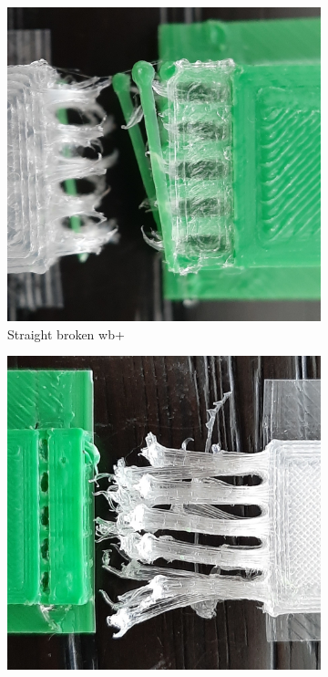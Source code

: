 \begin{figure}
\begin{subfigure}[B]{.99\columnwidth}
		\includegraphics[width=\figwidth]{sources/testing/j5_cropped.jpg}
		\caption{Straight broken wb+}
		\label{fig:failures_straight}
	\end{subfigure}
	\setlength{\figheight}{.25\columnwidth}
	\begin{subfigure}[B]{.28\columnwidth}
		\centering
		\includegraphics[height=\figheight]{sources/testing/a1_cropped.jpg}

\end{subfigure}
\end{figure}
